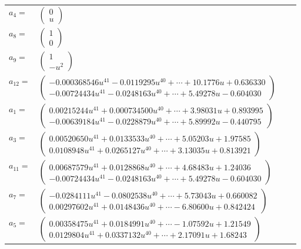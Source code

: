\documentclass[1p]{elsarticle_modified}
\theoremstyle{definition}
\begin{document}
\begin{tabular}{m{7pt} m{180pt} m{7pt} m{180pt} }
\flushright $a_{4}=$&$\begin{pmatrix}0\\u\end{pmatrix}$ \\
\flushright $a_{8}=$&$\begin{pmatrix}1\\0\end{pmatrix}$ \\
\flushright $a_{9}=$&$\begin{pmatrix}1\\- u^2\end{pmatrix}$ \\
\flushright $a_{12}=$&$\begin{pmatrix}-0.000368546 u^{41}-0.0119295 u^{40}+\cdots+10.1776 u+0.636330\\-0.00724434 u^{41}-0.0248163 u^{40}+\cdots+5.49278 u-0.604030\end{pmatrix}$ \\
\flushright $a_{1}=$&$\begin{pmatrix}0.00215244 u^{41}+0.000734500 u^{40}+\cdots+3.98031 u+0.893995\\-0.00639184 u^{41}-0.0228879 u^{40}+\cdots+5.89992 u-0.440795\end{pmatrix}$ \\
\flushright $a_{3}=$&$\begin{pmatrix}0.00520650 u^{41}+0.0133533 u^{40}+\cdots+5.05203 u+1.97585\\0.0108948 u^{41}+0.0265127 u^{40}+\cdots+3.13035 u+0.813921\end{pmatrix}$ \\
\flushright $a_{11}=$&$\begin{pmatrix}0.00687579 u^{41}+0.0128868 u^{40}+\cdots+4.68483 u+1.24036\\-0.00724434 u^{41}-0.0248163 u^{40}+\cdots+5.49278 u-0.604030\end{pmatrix}$ \\
\flushright $a_{7}=$&$\begin{pmatrix}-0.0284111 u^{41}-0.0802538 u^{40}+\cdots+5.73043 u+0.660082\\0.00297602 u^{41}+0.0148436 u^{40}+\cdots-6.80600 u+0.842424\end{pmatrix}$ \\
\flushright $a_{5}=$&$\begin{pmatrix}0.00358475 u^{41}+0.0184991 u^{40}+\cdots-1.07592 u+1.21549\\0.0129804 u^{41}+0.0337132 u^{40}+\cdots+2.17091 u+1.68243\end{pmatrix}$ \\

\end{tabular}
\end{document}
